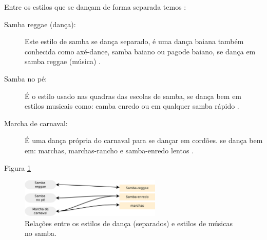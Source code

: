 Entre os estilos que se dançam de forma separada temos \cite[pp. 134]{perna2002samba}:
\begin{description}
\item[Samba reggae  (dança):] Este estilo de samba se dança separado, 
é uma dança baiana também conhecida como axé-dance, samba baiano ou pagode baiano,
se dança em samba reggae (música) \cite[pp. 134]{perna2002samba}.

\item[Samba no pé:] É o estilo usado nas quadras das escolas de samba,
se dança bem em estilos musicais como: 
camba enredo ou em qualquer samba rápido  \cite[pp. 134]{perna2002samba}.

\item[Marcha de carnaval:] É uma dança própria do carnaval para se dançar em cordões.
se dança bem em: marchas, marchas-rancho e samba-enredo lentos  \cite[pp. 135]{perna2002samba}.

\end{description}

Figura \ref{fig:sambadavavsmusicaseparado} \cite[pp. 134-138]{perna2002samba}

\begin{figure}[h]
  \centering
    \includegraphics[width=0.6\textwidth]{chapters/cap-historia/dancavcmusicaseparado.eps}
  \caption{Relações entre os estilos de dança (separados) e estilos de músicas no samba.}
\label{fig:sambadavavsmusicaseparado}
\end{figure}
